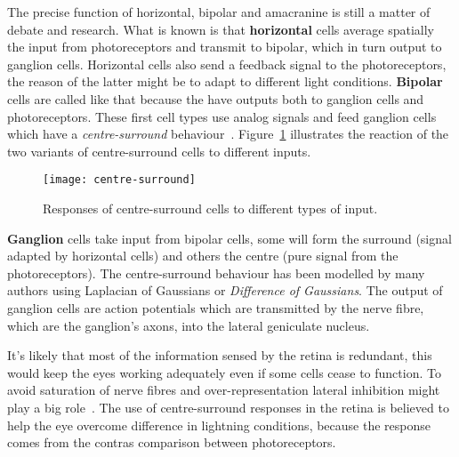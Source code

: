 The precise function of horizontal, bipolar and amacranine is still a matter of debate and research. What is known is that \textbf{horizontal} cells average spatially the input from photoreceptors and transmit to bipolar, which in turn output to ganglion cells. Horizontal cells also send a feedback signal to the photoreceptors, the reason of the latter might be to adapt to different light conditions. \textbf{Bipolar} cells are called like that because the have outputs both to ganglion cells and photoreceptors. These first cell types use analog signals and feed ganglion cells which have a \emph{centre-surround} behaviour~\cite{eye-brain-vision-hubel1995,thompson2000brain}. Figure~\ref{fig:vision:centre-surround} illustrates the reaction of the two variants of centre-surround cells to different inputs.

\begin{figure}[h]
  \begin{center}
    \texttt{[image: centre-surround]}
    \caption{Responses of centre-surround cells to different types of input.}
    \label{fig:vision:centre-surround}
  \end{center}
\end{figure}


\textbf{Ganglion} cells take input from bipolar cells, some will form the surround (signal adapted by horizontal cells) and others the centre (pure signal from the photoreceptors). The centre-surround behaviour has been modelled by many authors using Laplacian of Gaussians or \emph{Difference of Gaussians}. The output of ganglion cells are action potentials which are transmitted by the nerve fibre, which are the ganglion's axons, into the lateral geniculate nucleus.

It's likely that most of the information sensed by the retina is redundant, this would keep the eyes working adequately even if some cells cease to function. To avoid saturation of nerve fibres and over-representation lateral inhibition might play a big role~\cite{basab-model,thorpe-rate-coding-theory,field-sensory-coding}. The use of centre-surround responses in the retina is believed to help the eye overcome difference in lightning conditions, because the response comes from the contras comparison between photoreceptors.


